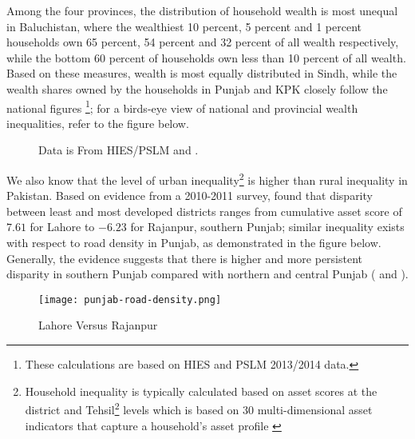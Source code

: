 \documentclass[12pt]{article}
\newcommand{\1}{\mathbbm 1}
\begin{document}
	 
	 Among the four provinces, the distribution of household wealth is most unequal in Baluchistan, where the wealthiest 10 percent, 5 percent and 1 percent households own 65 percent, 54 percent and 32 percent of all wealth respectively, while the bottom 60 percent of households own less than 10 percent of all wealth. Based on these measures, wealth is most equally distributed in Sindh, while the wealth shares owned by the households in Punjab and KPK closely follow the national figures \cite{burki2021LUMS}\footnote{These calculations are based on HIES and PSLM 2013/2014 data.}; for a birds-eye view of national and provincial wealth inequalities, refer to the figure below.
	 
	 
	 \begin{figure}[H]
	 	\centering
	 	\scalebox{0.8}{}
	 	\hfill
	 	\caption{Data is From HIES/PSLM and \cite{burki2021LUMS}.}
	 \end{figure}
	 
	 
	
	We also know that the level of urban inequality\footnote{Household inequality is typically calculated based on asset scores at the district and Tehsil\footnote{Sub-district level regional classification in Pakistan.} levels which is based on 30 multi-dimensional asset indicators that capture a household's asset profile \cite{burki2015multiple}} is higher than rural inequality in Pakistan. Based on evidence from a 2010-2011 survey, \cite{burki2015multiple} found that disparity between least and most developed districts ranges from cumulative asset score of $7.61$ for Lahore to $-6.23$ for Rajanpur, southern Punjab; similar inequality exists with respect to road density in Punjab, as demonstrated in the figure below. Generally, the evidence suggests that there is higher and more persistent disparity in southern Punjab compared with northern and central Punjab (\cite{mohey2017exploring} and \cite{burki2021LUMS}).
	
	
	\begin{figure}[H]
		\begin{center}
			\texttt{[image: punjab-road-density.png]}		
			\caption{Lahore Versus Rajanpur \cite{burki2015multiple}}
		\end{center}
	\end{figure}
	
	

	
	
	

	
	
\end{document}
